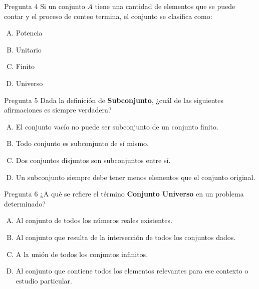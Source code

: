 \documentclass[aspectratio=169]{beamer}
\begin{document}
\begin{frame}
\begin{block}{Pregunta 4}
Si un conjunto \(A\) tiene una cantidad de elementos que se puede contar y el proceso de conteo termina, el conjunto se clasifica como:

\begin{enumerate}[A)]
    \item Potencia
    \item Unitario
    \item Finito
    \item Universo
\end{enumerate}
\end{block}

\end{frame}

\begin{frame}
\begin{block}{Pregunta 5}
Dada la definición de \textbf{Subconjunto}, ¿cuál de las siguientes afirmaciones es siempre verdadera?

\begin{enumerate}[A)]
    \item El conjunto vacío no puede ser subconjunto de un conjunto finito.
    \item Todo conjunto es subconjunto de sí mismo.
    \item Dos conjuntos disjuntos son subconjuntos entre sí.
    \item Un subconjunto siempre debe tener menos elementos que el conjunto original.
\end{enumerate}


\end{block}
\end{frame}


\begin{frame}
\begin{block}{Pregunta 6}
¿A qué se refiere el término \textbf{Conjunto Universo} en un problema determinado?

\begin{enumerate}[A)]
    \item Al conjunto de todos los números reales existentes.
    \item Al conjunto que resulta de la intersección de todos los conjuntos dados.
    \item A la unión de todos los conjuntos infinitos.
    \item Al conjunto que contiene todos los elementos relevantes para ese contexto o estudio particular.
\end{enumerate}
\end{block}
\end{frame}
\end{document}
